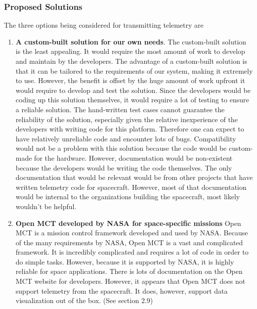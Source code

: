 \documentclass[letterpaper,10pt]{article}
\begin{document}
\subsubsection{Proposed Solutions}
The three options being considered for transmitting telemetry are
\begin{enumerate}
\item{
\textbf{A custom-built solution for our own needs}.
The custom-built solution is the least appealing. It would require the most amount of work to develop and maintain by the developers.
The advantage of a custom-built solution is that it can be tailored to the requirements of our system, making it extremely to use.
However, the benefit is offset by the huge amount of work upfront it would require to develop and test the solution.
Since the developers would be coding up this solution themselves, it would require a lot of testing to ensure a reliable solution.
The hand-written test cases cannot guarantee the reliability of the solution, 
especially given the relative inexperience of the developers with writing code for this platform.
Therefore one can expect to have relatively unreliable code and encounter lots of bugs.
Compatibility would not be a problem with this solution because the code would be custom-made for the hardware.
However, documentation would be non-existent because the developers would be writing the code themselves.
The only documentation that would be relevant would be from other projects that have written telemetry code for spacecraft.
However, most of that documentation would be internal to the organizations building the spacecraft,
most likely wouldn't be helpful.
}

\item{
\textbf{Open MCT developed by NASA for space-specific missions}
Open MCT is a mission control framework developed and used by NASA.
Because of the many requirements by NASA, Open MCT is a vast and complicated framework.
It is incredibly complicated and requires a lot of code in order to do simple tasks.
However, because it is supported by NASA, it is highly reliable for space applications.
There is lots of documentation on the Open MCT website for developers.
However, it appears that Open MCT does not support telemetry from the spacecraft.
It does, however, support data visualization out of the box. (See section 2.9)
}


\end{enumerate}
\end{document}
